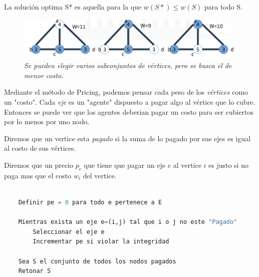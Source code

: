\documentclass{article}
\begin{document}
La solución optima S* es aquella para la que \(w(S*) \leq w(S)\) para todo S.

\begin{figure}[h!]
    \begin{center} 
    \includegraphics[width=\linewidth]{imagenes/problema-aprox-vertexcover.png}
    \caption{\small \sl Se pueden elegir varios subconjuntos de vértices, pero se busca el de menor costo.} 
    \end{center}
\end{figure}

Mediante el método de Pricing, podemos pensar cada peso de los \textit{vértices} como un "costo".
Cada \textit{eje} es un "agente" dispuesto a pagar algo al vértice que lo cubre. Entonces se puede ver 
que los agentes deberian pagar un costo para ser cubiertos por lo menos por uno nodo.

Diremos que un vertice esta \textit{pagado} si la suma de lo pagado por sus ejes es igual al costo de sus vértices.

Diremos que un precio \(p_e\) que tiene que pagar un eje \(e\) al vertice \(i \) es justo si no paga 
mas que el costo \(w_i\) del vertice.


\begin{lstlisting}[language=Python, caption=Algoritmo de aproximación greedy. La integridad se respeta si se paga el precio justo.]
    
    Definir pe = 0 para todo e pertenece a E

    Mientras exista un eje e=(i,j) tal que i o j no este "Pagado"
        Seleccionar el eje e
        Incrementar pe si violar la integridad
    
    Sea S el conjunto de todos los nodos pagados
    Retonar S

\end{lstlisting}   
\end{document}
